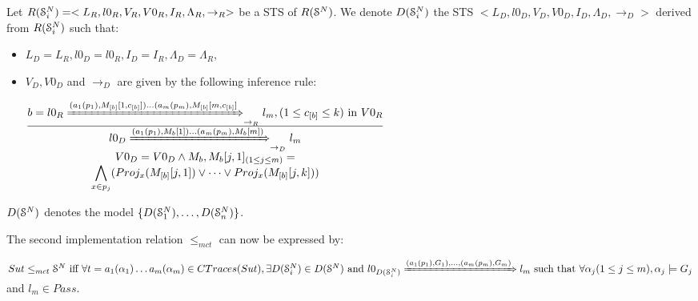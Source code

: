 
\begin{definition}
    Let $R(\EuScript{S}_i^{N})=<L_R,l0_R,V_R,V0_R,I_R,\Lambda_R,\rightarrow_R>$ be a STS of $R(\EuScript{S}^{N})$. We denote $D(\EuScript{S}_i^{N})$ the STS $ <L_D,l0_D,V_D,V0_D,I_D,\Lambda_D,\rightarrow_D>$ derived from $R(\EuScript{S}_i^{N})$ such that:
\begin{itemize}
    \item $L_D=L_{R}, l0_D=l0_{R}, I_D=I_{R}, \Lambda_D=\Lambda_{R}$,
    \item $V_D, V0_D$ and $\rightarrow_D$ are given by the following inference rule:

				$\frac{
					\begin{matrix}
					b=l0_{R}
					\xRightarrow{(a_1(p_1),M_{[b]}[1,c_{[b]}])\dots (a_m(p_m),M_{[b]}[m,c_{[b]}]}_{\rightarrow_{R}}
					l_{m},
					(1 \leq c_{[b]} \leq k) \text{ in } V0_{R}
					\end{matrix}
				}
				{
					\begin{matrix}
					l0_D
					\xRightarrow{(a_1(p_1),M_b[1])\dots (a_m(p_m),M_b[m])}_{\rightarrow_D}
					l_m\\
					V0_D=V0_D \wedge M_b, M_b[j, 1]_{(1\leq j \leq m)} =\\
					 \displaystyle \bigwedge_{x \in p_j} ( Proj_x(M_{[b]}[j, 1]) \vee \dots \vee Proj_x(M_{[b]}[j, k]))



					\end{matrix}
				}$
  \end{itemize}

    $D(\EuScript{S}^{N})$ denotes the model $\{D(\EuScript{S}_1^{N}),\dots,D(\EuScript{S}_n^{N}) \}$.
\end{definition}


The second implementation relation $\leq_{mct}$ can now be
expressed by:

\begin{proposition}
    ${Sut} \leq_{mct} \EuScript{S}^{N} \text{ iff }\forall t=
    a_1(\alpha_1) \dots a_m(\alpha_m) \in CTraces({Sut}), \exists
    D(\EuScript{S}_i^{N}) \in D(\EuScript{S}^{N}) \text{ and }
    l0_{D(\EuScript{S}_i^{N})}
    \xRightarrow{(a_1(p_1),G_{1}),\dots,(a_m(p_m),G_{m})} l_m
    \text{ such that } \forall \alpha_j (1 \leq j \leq m),
    \alpha_j \models G_{j}$ and $l_m \in Pass$.
\end{proposition}


